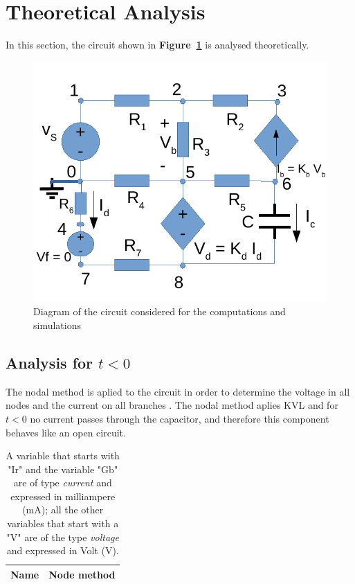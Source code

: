 \section{Theoretical Analysis}
\label{sec:analysis}

In this section, the circuit shown in \textbf{Figure~\ref{fig:diagram_t2}} is analysed
theoretically.\par

\begin{figure}[h!] \centering
\includegraphics[width=0.6\linewidth]{diagram_t2.pdf}
\caption{Diagram of the circuit considered for the computations and simulations}
\label{fig:diagram_t2}
\end{figure}

\subsection{Analysis for $t<0$} 
The nodal method is aplied to the circuit in order to determine the voltage in all nodes and the current on all branches . The nodal method aplies KVL and for $t<0$ no current passes through the capacitor, and therefore this component behaves like an open circuit.
 
\begin{table}[h!]
  \centering 
  \begin{tabular}{|l|r|}
    \hline    
    {\bf Name} & {\bf Node method}\\ \hline
    
  \end{tabular}
  \caption{A variable that starts with "Ir" and the variable "Gb" are of type {\em current}
    and expressed in milliampere (mA); all the other variables that start with a "V" are of the type {\it voltage} and expressed in
    Volt (V).}
  \label{tab:theoretical}
\end{table}

